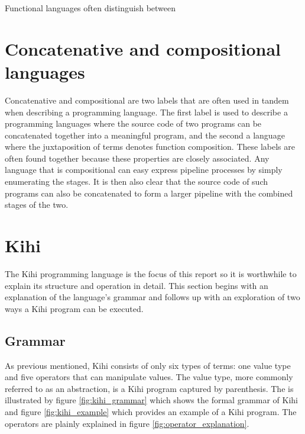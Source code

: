 Functional languages often distinguish between 



\section{Concatenative and compositional languages}
Concatenative and compositional are two labels that are often used in tandem when describing a programming language. The first label is used to describe a programming languages where the source code of two programs can be concatenated together into a meaningful program, and the second a language where the juxtaposition of terms denotes function composition. These labels are often found together because these properties are closely associated. Any language that is compositional can easy express pipeline processes by simply enumerating the stages. It is then also clear that the source code of such programs can also be concatenated to form a larger pipeline with the combined stages of the two.





\section{Kihi}
The Kihi programming language is the focus of this report so it is worthwhile to explain its structure and operation in detail. This section begins with an explanation of the language's grammar and follows up with an exploration of two ways a Kihi program can be executed.

\subsection{Grammar}
As previous mentioned, Kihi consists of only six types of terms: one value type and five operators that can manipulate values. The value type, more commonly referred to as an abstraction, is a Kihi program captured by parenthesis. The is illustrated by figure \ref{fig:kihi_grammar} which shows the formal grammar of Kihi and figure \ref{fig:kihi_example} which provides an example of a Kihi program. The operators are plainly explained in figure \ref{fig:operator_explanation}.


